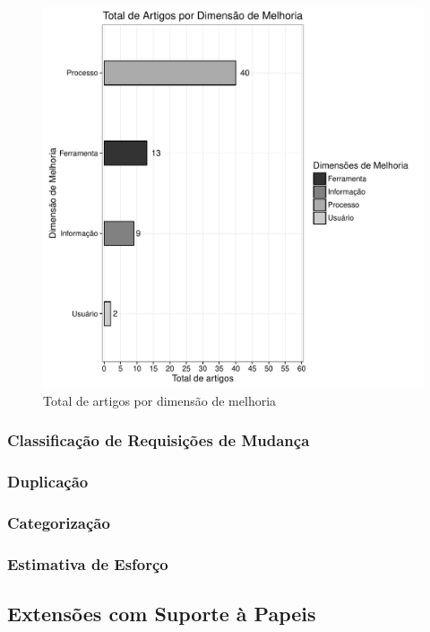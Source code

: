 \begin{figure}[htpb]
	\centering
	\includegraphics[width=0.9\linewidth]{./chapter-mapeamento-sistematico/img/grafico_dim_melhoria_por_artigo.pdf}
	\caption{Total de artigos por dimensão de melhoria}
	\label{fig:grafico_dim_melhoria_por_artigo}
\end{figure}


\subsubsection{Classificação de Requisições de Mudança}
\label{ssub:classificação_de_requisições_de_mudança}

\subsubsection{Duplicação}
\subsubsection{Categorização}
\subsubsection{Estimativa de Esforço}

\subsection{Extensões com Suporte à Papeis}
\label{sub:extensões_com_suporte_à_papeis}


